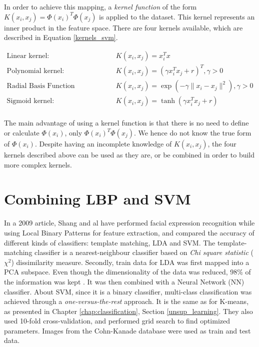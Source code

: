 \noindent In order to achieve this mapping, a \textit{kernel function} of the form $K(x_i, x_j) = \Phi(x_i)^T \Phi(x_j)$ is applied to the dataset. This kernel represents an inner product in the feature space. There are four kernels available, which are described in Equation \ref{kernels_svm}.
\newline

\begin{equation}
\begin{array}{ll}
	\text{Linear kernel:} & K(x_i,x_j) = x_i^Tx \\
	\text{Polynomial kernel:} & K(x_i,x_j) = (\gamma x_i^Tx_j + r)^T, \gamma > 0 \\
	\text{Radial Basis Function (Gaussian) kernel:} & K(x_i,x_j) = \exp(-\gamma \| x_i - x_j \|^2), \gamma > 0 \\
	\text{Sigmoid kernel:} & K(x_i,x_j) = \tanh(\gamma x_i^T x_j + r)\\
\end{array}
\label{kernels_svm}
\end{equation}

\vspace{\baselineskip}

\noindent The main advantage of using a kernel function is that there is no need to define or calculate $\Phi(x_i)$, only $\Phi(x_i)^T \Phi(x_j)$. We hence do not know the true form of $\Phi(x_i)$. Despite having an incomplete knowledge of $K(x_i,x_j)$, the four kernels described above can be used as they are, or be combined in order to build more complex kernels.
\newline

\section{Combining LBP and SVM}

\vspace{\baselineskip}
\noindent In a 2009 article, Shang and al \cite{SHA09} have performed facial expression recognition while using Local Binary Patterns for feature extraction, and compared the accuracy of different kinds of classifiers:  template matching,  LDA and SVM. The template-matching classifier is a nearest-neighbour classifier based on \textit{Chi square statistic} ($\chi^2$) dissimilarity measure. Secondly, train data for LDA was first mapped into a PCA subspace. Even though the dimensionality of the data was reduced, 98\% of the information was kept \cite{SHA09}. It was then combined with a Neural Network (NN) classifier. About SVM, since it is a binary classifier, multi-class classification was achieved through a \textit{one-versus-the-rest} approach. It is the same as for K-means, as presented in Chapter \ref{chap:classification}, Section \ref{unsup_learning}. They also used 10-fold cross-validation, and performed grid search to find optimized parameters. Images from the Cohn-Kanade database were used as train and test data.
\newline

